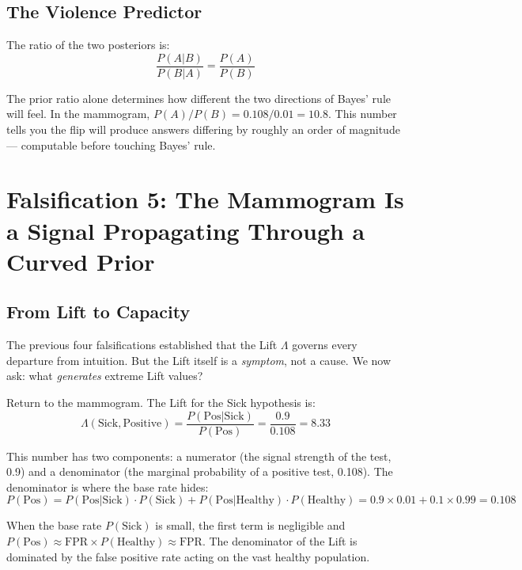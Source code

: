 \documentclass[12pt]{article}
\begin{document}
\subsection{The Violence Predictor}

The ratio of the two posteriors is:
\begin{equation}
\frac{P(A|B)}{P(B|A)} = \frac{P(A)}{P(B)}
\end{equation}

The prior ratio alone determines how different the two directions of Bayes' rule will feel. In the mammogram, $P(A)/P(B) = 0.108/0.01 = 10.8$. This number tells you the flip will produce answers differing by roughly an order of magnitude --- computable before touching Bayes' rule.

\section{Falsification 5: The Mammogram Is a Signal Propagating Through a Curved Prior}

\subsection{From Lift to Capacity}

The previous four falsifications established that the Lift $\Lambda$ governs every departure from intuition. But the Lift itself is a \textit{symptom}, not a cause. We now ask: what \textit{generates} extreme Lift values?

Return to the mammogram. The Lift for the Sick hypothesis is:
\begin{equation}
\Lambda(\text{Sick}, \text{Positive}) = \frac{P(\text{Pos}|\text{Sick})}{P(\text{Pos})} = \frac{0.9}{0.108} = 8.33
\end{equation}

This number has two components: a numerator (the signal strength of the test, 0.9) and a denominator (the marginal probability of a positive test, 0.108). The denominator is where the base rate hides:
\begin{equation}
P(\text{Pos}) = P(\text{Pos}|\text{Sick}) \cdot P(\text{Sick}) + P(\text{Pos}|\text{Healthy}) \cdot P(\text{Healthy}) = 0.9 \times 0.01 + 0.1 \times 0.99 = 0.108
\end{equation}

When the base rate $P(\text{Sick})$ is small, the first term is negligible and $P(\text{Pos}) \approx \text{FPR} \times P(\text{Healthy}) \approx \text{FPR}$. The denominator of the Lift is dominated by the false positive rate acting on the vast healthy population.
\end{document}
